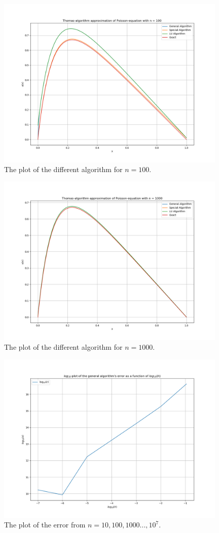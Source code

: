 \documentclass{article}
\begin{document}
\begin{figure}[ht]
	\centering
	\label{fig:data100png}
	\includegraphics[width = 11cm]{program/data100.png}
	\caption{The plot of the different algorithm for $n = 100$. }
\end{figure}

\begin{figure}[ht]
	\centering
	\label{fig:data1000png}
	\includegraphics[width = 11cm]{program/data1000.png}
	\caption{The plot of the different algorithm for $n = 1000$. }
\end{figure}

\begin{figure}[ht]
	\centering
	\label{fig:errorpng}
	\includegraphics[width = 11cm]{program/error.png}
	\caption{The plot of the error from $n = 10, 100, 1000 ... , 10^7$. }
\end{figure}
\end{document}

